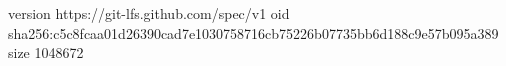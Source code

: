version https://git-lfs.github.com/spec/v1
oid sha256:c5c8fcaa01d26390cad7e1030758716cb75226b07735bb6d188c9e57b095a389
size 1048672
